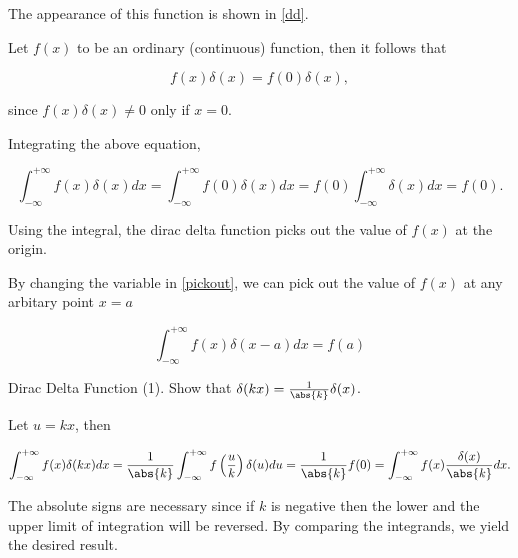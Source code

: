 \documentclass[english,a4paper,12pt]{report}
\begin{document}
The appearance of this function is shown in \cref{dd}.
	
Let \(f(x)\) to be an ordinary (continuous) function, then it follows that

\begin{equation} 
	f(x)\delta(x) = f(0)\delta(x), \label{ddimport} 
\end{equation}
	
since \(f(x) \delta(x) \neq 0\) only if \(x = 0\).
	
Integrating the above equation,

\begin{equation} 
	\int_{-\infty}^{+\infty} f(x) \delta(x) dx = \int_{-\infty}^{+\infty} f(0) \delta(x) dx = f(0) \int_{-\infty}^{+\infty} \delta(x) dx = f(0). \label{pickout} 
\end{equation} 
	
Using the integral, the dirac delta function picks out the value of \(f(x)\) at the origin.
	
By changing the variable in \cref{pickout}, we can pick out the value of \(f(x)\) at any arbitary point \(x = a\)
	
\begin{equation} 
	\int_{-\infty}^{+\infty} f(x) \delta(x-a) dx = f(a) 
\end{equation}
	
\example
{Dirac Delta Function (1).}
{Show that \(\delta(kx) = \frac{1}{\abs{k}}\delta(x)\).}
{Let \(u = kx\), then 
			
\begin{equation} 
	\int_{-\infty}^{+\infty} f(x) \delta(kx) dx = \frac{1}{\abs{k} }  \int_{-\infty}^{+\infty} f\left(\frac{u}{k}\right) \delta(u) du = \frac{1}{\abs{k}} f(0) = \int_{-\infty}^{+\infty} f(x) \frac{\delta(x)}{\abs{k}} dx.
\end{equation}
			
The absolute signs are necessary since if \(k\) is negative then the lower and the upper limit of integration will be reversed. By comparing the integrands, we yield the desired result.}	
		

\end{document}

